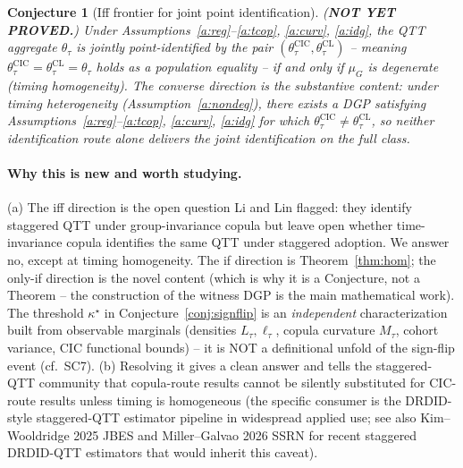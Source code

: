 \documentclass[11pt]{article}
\theoremstyle{definition}
\theoremstyle{plain}
\newtheorem{conjecture}{Conjecture}
\theoremstyle{remark}
\begin{document}
\begin{conjecture}[Iff frontier for joint point identification]\label{conj:iff}
(\textbf{NOT YET PROVED.}) Under Assumptions~\ref{a:reg}--\ref{a:tcop}, \ref{a:curv}, \ref{a:idg}, the QTT aggregate $\theta_\tau$ is \emph{jointly point-identified} by the pair $(\theta^{\mathrm{CIC}}_\tau, \theta^{\mathrm{CL}}_\tau)$ -- meaning $\theta^{\mathrm{CIC}}_\tau = \theta^{\mathrm{CL}}_\tau = \theta_\tau$ holds as a population equality -- if and only if $\mu_G$ is degenerate (timing homogeneity). The converse direction is the substantive content: under timing heterogeneity (Assumption~\ref{a:nondeg}), there exists a DGP satisfying Assumptions~\ref{a:reg}--\ref{a:tcop}, \ref{a:curv}, \ref{a:idg} for which $\theta^{\mathrm{CIC}}_\tau \ne \theta^{\mathrm{CL}}_\tau$, so neither identification route alone delivers the joint identification on the full class.
\end{conjecture}

\paragraph{Why this is new and worth studying.}
(a) The iff direction is the open question Li and Lin \cite[concluding remarks]{LiLin2024} flagged: they identify staggered QTT under group-invariance copula but leave open whether time-invariance copula identifies the same QTT under staggered adoption. We answer no, except at timing homogeneity. The if direction is Theorem~\ref{thm:hom}; the only-if direction is the novel content (which is why it is a Conjecture, not a Theorem -- the construction of the witness DGP is the main mathematical work). The threshold $\kappa^\star$ in Conjecture~\ref{conj:signflip} is an \emph{independent} characterization built from observable marginals (densities $L_\tau, \ell_\tau$, copula curvature $M_\tau$, cohort variance, CIC functional bounds) -- it is NOT a definitional unfold of the sign-flip event (cf.\ SC7).
(b) Resolving it gives \cite{LiLin2024} a clean answer and tells the staggered-QTT community that copula-route results cannot be silently substituted for CIC-route results unless timing is homogeneous (the specific consumer is the DRDID-style staggered-QTT estimator pipeline in widespread applied use; see also Kim--Wooldridge 2025 JBES and Miller--Galvao 2026 SSRN for recent staggered DRDID-QTT estimators that would inherit this caveat).
\end{document}
